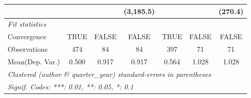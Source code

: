 \begin{tabular}{lcccccc}
                           &         &              & (3,185.5)    &         &              & (270.4)\\   
   \midrule
   \emph{Fit statistics}\\
   Convergence             &TRUE     & FALSE        & FALSE        & TRUE    & FALSE        & FALSE\\  
   Observations            & 474     & 84           & 84           & 397     & 71           & 71\\  
Mean(Dep. Var.) & 0.500 & 0.917 & 0.917 & 0.564 & 1.028 & 1.028 \\
   \midrule \midrule
   \multicolumn{7}{l}{\emph{Clustered (author \& quarter\_year) standard-errors in parentheses}}\\
   \multicolumn{7}{l}{\emph{Signif. Codes: ***: 0.01, **: 0.05, *: 0.1}}\\
\end{tabular}
\par\endgroup
